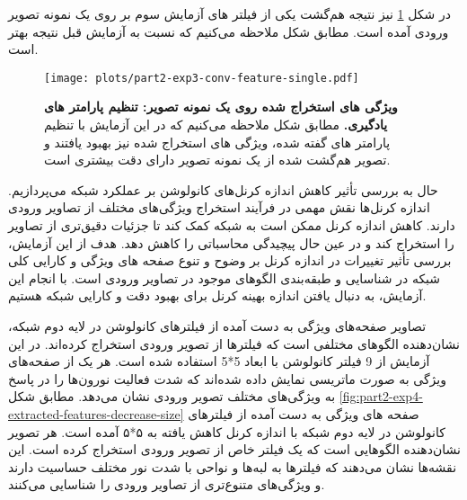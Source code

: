                 در شکل 
                \ref{fig:part2-exp3-conv-feature-single}
                نیز نتیجه هم‌گشت یکی از فیلتر های آزمایش سوم بر روی یک نمونه تصویر ورودی آمده است. مطابق شکل ملاحظه می‌کنیم که نسبت به آزمایش قبل نتیجه بهتر است.

                \begin{figure}[!ht]
                    \centering
                    \texttt{[image: plots/part2-exp3-conv-feature-single.pdf]} 
                    \captionsetup{width=.9\linewidth}
                    \caption{\textbf{ ویژگی های استخراج شده روی یک نمونه تصویر: تنظیم پارامتر های یادگیری. } مطابق شکل ملاحظه می‌کنیم که در این آزمایش با تنظیم پارامتر های گفته شده، ویژگی های استخراج شده نیز بهبود یافتند و تصویر هم‌گشت شده از یک نمونه تصویر دارای دقت بیشتری است.
                    }
                    \label{fig:part2-exp3-conv-feature-single}
                \end{figure}

                حال به بررسی تأثیر کاهش اندازه کرنل‌های کانولوشن بر عملکرد شبکه
                می‌پردازیم. اندازه کرنل‌ها نقش مهمی در فرآیند استخراج ویژگی‌های مختلف از تصاویر ورودی دارند. کاهش اندازه کرنل ممکن است به شبکه کمک کند تا جزئیات دقیق‌تری از تصاویر را استخراج کند و در عین حال پیچیدگی محاسباتی را کاهش دهد. هدف از این آزمایش، بررسی تأثیر تغییرات در اندازه کرنل بر وضوح و تنوع صفحه های ویژگی 
                و کارایی کلی شبکه در شناسایی و طبقه‌بندی الگوهای موجود در تصاویر ورودی است. با انجام این آزمایش، به دنبال یافتن اندازه بهینه کرنل برای بهبود دقت و کارایی شبکه هستیم.

                تصاویر صفحه‌های ویژگی به دست آمده از فیلترهای کانولوشن در لایه دوم شبکه، نشان‌دهنده الگوهای مختلفی است که فیلترها از تصویر ورودی استخراج کرده‌اند. در این آزمایش از
                9
                فیلتر کانولوشن با ابعاد 
                5*5
                استفاده شده است. هر یک از صفحه‌های ویژگی به صورت ماتریسی نمایش داده شده‌اند که شدت فعالیت نورون‌ها را در پاسخ به ویژگی‌های مختلف تصویر ورودی نشان می‌دهد. مطابق شکل 
                \ref{fig:part2-exp4-extracted-features-decrease-size}
                صفحه های ویژگی به دست آمده از فیلترهای کانولوشن در لایه دوم شبکه با اندازه کرنل کاهش یافته به 
                ۵*۵
                آمده است. هر تصویر نشان‌دهنده الگوهایی است که یک فیلتر خاص از تصویر ورودی استخراج کرده است. این نقشه‌ها نشان می‌دهند که فیلترها به لبه‌ها و نواحی با شدت نور مختلف حساسیت دارند و ویژگی‌های متنوع‌تری از تصاویر ورودی را شناسایی می‌کنند.

